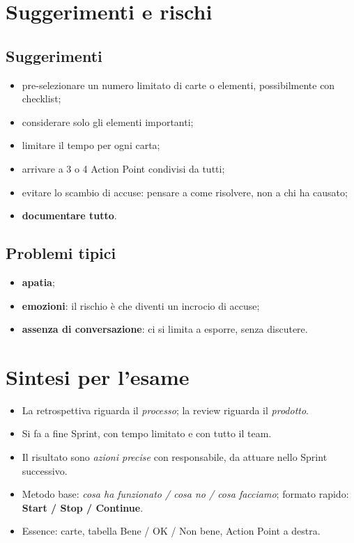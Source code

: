 \documentclass[a4paper,11pt]{article}
\begin{document}
\section{Suggerimenti e rischi}
\subsection*{Suggerimenti}
\begin{itemize}[nosep]
  \item pre-selezionare un numero limitato di carte o elementi, possibilmente con checklist;
  \item considerare solo gli elementi importanti;
  \item limitare il tempo per ogni carta;
  \item arrivare a 3 o 4 Action Point condivisi da tutti;
  \item evitare lo scambio di accuse: pensare a come risolvere, non a chi ha causato;
  \item \textbf{documentare tutto}.
\end{itemize}

\subsection*{Problemi tipici}
\begin{itemize}[nosep]
  \item \textbf{apatia};
  \item \textbf{emozioni}: il rischio è che diventi un incrocio di accuse;
  \item \textbf{assenza di conversazione}: ci si limita a esporre, senza discutere.
\end{itemize}

\section{Sintesi per l'esame}
\begin{itemize}[nosep]
  \item La retrospettiva riguarda il \emph{processo}; la review riguarda il \emph{prodotto}.
  \item Si fa a fine Sprint, con tempo limitato e con tutto il team.
  \item Il risultato sono \emph{azioni precise} con responsabile, da attuare nello Sprint successivo.
  \item Metodo base: \emph{cosa ha funzionato / cosa no / cosa facciamo}; formato rapido:
        \textbf{Start / Stop / Continue}.
  \item Essence: carte, tabella Bene / OK / Non bene, Action Point a destra.
\end{itemize}
\end{document}
